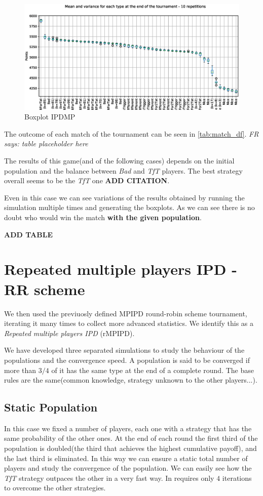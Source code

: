 \documentclass[journal,a4paper,10pt,twoside]{IEEEtran} %
\newcommand{\FR}[1]{\textit{\color{ForestGreen}FR says: #1}}
\begin{document}
\begin{figure}[!ht]
    \centering
    \includegraphics[width=1\columnwidth]{../img/ipdmp/ipdmp-boxplot-final-points-50}
    \caption{Boxplot IPDMP}
    \label{fig:boxIPDMP}
\end{figure}

The outcome of each match of the tournament can be seen in \autoref{tab:match_df}. \FR{table placeholder here}

The results of this game(and of the following cases) depends on the initial population and the balance between \textit{Bad} and \textit{TfT} players. The best strategy overall seems to be the \textit{TfT} one \textbf{ADD CITATION}.

Even in this case we can see variations of the results obtained by running the simulation multiple times and generating the boxplots. As we can see there is no doubt who would win the match \textbf{with the given population}.

\textbf{ADD TABLE}

\section{Repeated multiple players IPD - RR scheme} \label{s:rIPDMP}
We then used the previuosly defined MPIPD round-robin scheme tournament, iterating it many times to collect more advanced statistics.
We identify this as a \textit{Repeated multiple players IPD} (rMPIPD).

We have developed three separated simulations to study the behaviour of the populations and the convergence speed. A population is said to be converged if more than $3/4$ of it has the same type at the end of a complete round. The base rules are the same(common knowledge, strategy unknown to the other players...).

\subsection{Static Population}
In this case we fixed a number of players, each one with a strategy that has the same probability of the other ones. At the end of each round the first third of the population is doubled(the third that achieves the highest cumulative payoff), and the last third is eliminated. In this way we can ensure a static total number of players and study the convergence of the population.
We can easily see how the \textit{TfT} strategy outpaces the other in a very fast way. In requires only $4$ iterations to overcome the other strategies.
\end{document}
